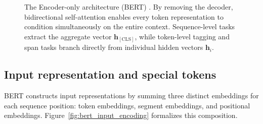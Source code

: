 \documentclass[../../../main.tex]{subfiles}
\begin{document}
\begin{figure}[t]
\caption{The Encoder-only architecture (BERT) \cite{devlin2019}. By removing the decoder, bidirectional self-attention enables every token representation to condition simultaneously on the entire context. Sequence-level tasks extract the aggregate vector $\mathbf{h}_{[\text{CLS}]}$, while token-level tagging and span tasks branch directly from individual hidden vectors $\mathbf{h}_i$.}
\label{fig:encoder_only_bert}
\end{figure}


\subsection{Input representation and special tokens}
\label{subsec:bert_input_representation}

BERT constructs input representations by summing three distinct embeddings for each sequence position: token embeddings, segment embeddings, and positional embeddings. Figure~\ref{fig:bert_input_encoding} formalizes this composition.
\end{document}
